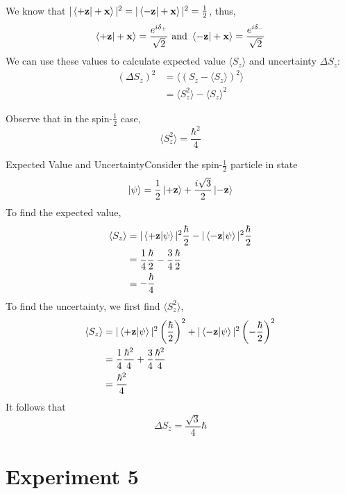 \documentclass{report}
\newcommand{\ex}[2]{\begin{Example}{#1}{}#2\end{Example}}
\newcommand{\nt}[1]{\begin{note}#1\end{note}}
\begin{document}
We know that \(|\braket{+ \mathbf z | + \mathbf x}|^2 =|\braket{- \mathbf z | + \mathbf x}|^2 = \frac{1}{2} \), thus, 
\[
	\braket{+ \mathbf z | + \mathbf x} = \frac{e^{i\delta_+}}{\sqrt 2} \text{ and } \braket{- \mathbf z | + \mathbf x} = \frac{e^{i\delta_-}}{\sqrt 2}
\]
We can use these values to calculate expected value \(\langle S_z \rangle\) and uncertainty \(\Delta S_z\):
\begin{align*}
	(\Delta S_z)^2 &= \langle ( S_z - \langle S_z \rangle ) ^2 \rangle\\
		       &=\langle S_z^2 \rangle - \langle S_z \rangle ^2
\end{align*}
\nt{Observe that in the spin-\(\frac{1}{2}\) case, \[
		\langle S_z ^2 \rangle = \frac{\hbar ^2 }{4}
\] }
\ex{Expected Value and Uncertainty}{Consider the spin-\(\frac{1}{2}\) particle in state
\[
\ket \psi = \frac{1}{2}\ket{+ \mathbf z} + \frac{i \sqrt 3}{2}\ket{- \mathbf z}
\] 
To find the expected value, 
\begin{align*}
\langle S_z \rangle & = |\braket{+ \mathbf z | \psi}|^2 \frac{\hbar}{2} - |\braket{- \mathbf z | \psi}|^2 \frac{\hbar}{2} \\
		    &=\frac{1}{4}\frac{\hbar}{2} - \frac{3}{4}\frac{\hbar}{2} \\
		    &= -\frac{\hbar}{4}
\end{align*}
To find the uncertainty, we first find \(\langle S_z^2 \rangle\),
\begin{align*}
\langle S_z \rangle & = |\braket{+ \mathbf z | \psi}|^2 \left(\frac{\hbar}{2}\right)^2 + |\braket{- \mathbf z | \psi}|^2 \left(-\frac{\hbar}{2}\right)^2 \\
		    &=\frac{1}{4}\frac{\hbar^2}{4} + \frac{3}{4}\frac{\hbar^2}{4} \\
		    &= \frac{\hbar^2}{4}
\end{align*}
It follows that 
\[
\Delta S_z = \frac{\sqrt 3}{4}\hbar
\] 

}
\section{Experiment 5}
\end{document}
